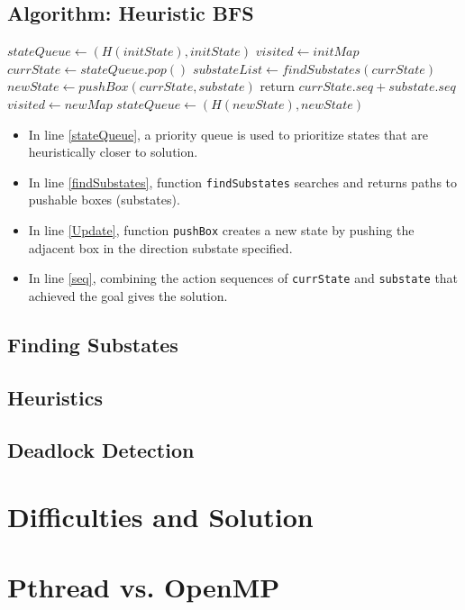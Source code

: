 \documentclass[a4paper, 11pt]{article}
\begin{document}
        \subsection{Algorithm: Heuristic BFS}
            \begin{algorithmic}[1] 
                \State $stateQueue \gets (H(initState), initState)$ \label{stateQueue}
                \State $visited \gets initMap$
                    \State $currState \gets stateQueue.pop()$
                    \State $substateList \gets findSubstates(currState)$ \label{findSubstates}
                        \State $newState \gets pushBox(currState, substate)$ \label{Update}
                            \State return $currState.seq + substate.seq$ \label{seq}
                        \EndIf
                            \State $visited \gets newMap$
                             \label{deadlock}
                                \State $stateQueue \gets (H(newState), newState)$
                            \EndIf
                        \EndIf
                    \EndFor
                \EndWhile
            \end{algorithmic}

            \begin{itemize}
                \item In line \ref{stateQueue}, a priority queue is used to 
                    prioritize states that are heuristically closer to solution.
                \item In line \ref{findSubstates}, function \texttt{findSubstates} searches and returns
                    paths to pushable boxes (substates).
                \item In line \ref{Update}, function \texttt{pushBox} creates a new state by 
                    pushing the adjacent box in the direction substate specified.
                \item In line \ref{seq}, combining the action sequences of \texttt{currState} 
                    and \texttt{substate} that achieved the goal gives the solution.
            \end{itemize}

        \subsection{Finding Substates}

        \subsection{Heuristics}

        \subsection{Deadlock Detection}

    \section{Difficulties and Solution}

    \section{Pthread vs. OpenMP}
\end{document}

